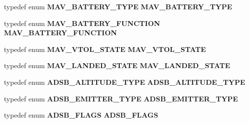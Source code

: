 \begin{DoxyCompactItemize}
\item 
typedef enum \textbf{ M\+A\+V\+\_\+\+B\+A\+T\+T\+E\+R\+Y\+\_\+\+T\+Y\+PE} \textbf{ M\+A\+V\+\_\+\+B\+A\+T\+T\+E\+R\+Y\+\_\+\+T\+Y\+PE}
\item 
typedef enum \textbf{ M\+A\+V\+\_\+\+B\+A\+T\+T\+E\+R\+Y\+\_\+\+F\+U\+N\+C\+T\+I\+ON} \textbf{ M\+A\+V\+\_\+\+B\+A\+T\+T\+E\+R\+Y\+\_\+\+F\+U\+N\+C\+T\+I\+ON}
\item 
typedef enum \textbf{ M\+A\+V\+\_\+\+V\+T\+O\+L\+\_\+\+S\+T\+A\+TE} \textbf{ M\+A\+V\+\_\+\+V\+T\+O\+L\+\_\+\+S\+T\+A\+TE}
\item 
typedef enum \textbf{ M\+A\+V\+\_\+\+L\+A\+N\+D\+E\+D\+\_\+\+S\+T\+A\+TE} \textbf{ M\+A\+V\+\_\+\+L\+A\+N\+D\+E\+D\+\_\+\+S\+T\+A\+TE}
\item 
typedef enum \textbf{ A\+D\+S\+B\+\_\+\+A\+L\+T\+I\+T\+U\+D\+E\+\_\+\+T\+Y\+PE} \textbf{ A\+D\+S\+B\+\_\+\+A\+L\+T\+I\+T\+U\+D\+E\+\_\+\+T\+Y\+PE}
\item 
typedef enum \textbf{ A\+D\+S\+B\+\_\+\+E\+M\+I\+T\+T\+E\+R\+\_\+\+T\+Y\+PE} \textbf{ A\+D\+S\+B\+\_\+\+E\+M\+I\+T\+T\+E\+R\+\_\+\+T\+Y\+PE}
\item 
typedef enum \textbf{ A\+D\+S\+B\+\_\+\+F\+L\+A\+GS} \textbf{ A\+D\+S\+B\+\_\+\+F\+L\+A\+GS}
\end{DoxyCompactItemize}
